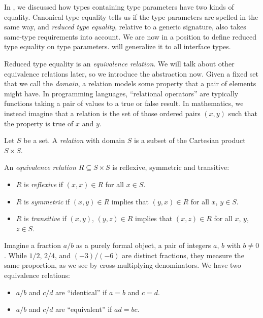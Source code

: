 \documentclass[../generics]{subfiles}
\begin{document}
In , we discussed how types containing type parameters have two kinds of equality. Canonical type equality tells us if the type parameters are spelled in the same way, and \emph{reduced type equality}, relative to a generic signature, also takes same-type requirements into account. We are now in a position to define reduced type equality on type parameters.  will generalize it to all interface types.

Reduced type equality is an \emph{equivalence relation}. We will talk about other equivalence relations later, so we introduce the abstraction now. Given a fixed set that we call the \emph{domain}, a relation models some property that a pair of elements might have. In programming languages, ``relational operators'' are typically functions taking a pair of values to a true or false result. In mathematics, we instead imagine that a relation is the set of those ordered pairs $(x,y)$ such that the property is true of $x$ and $y$.

\begin{definition}\label{def relation}
Let $S$ be a set. A \emph{relation} with domain $S$ is a subset of the Cartesian product $S\times S$.
\end{definition}

\begin{definition}
An \emph{equivalence relation} $R\subseteq S\times S$ is reflexive, symmetric and transitive:
\begin{itemize}
\item $R$ is \emph{reflexive} if $(x,x)\in R$ for all $x\in S$.
\item $R$ is \emph{symmetric} if $(x,y)\in R$ implies that $(y,x)\in R$ for all $x$, $y\in S$.
\item $R$ is \emph{transitive} if $(x,y)$, $(y,z)\in R$ implies that $(x,z)\in R$ for all $x$, $y$, $z\in S$.
\end{itemize}
\end{definition}

Imagine a fraction $a/b$ as a purely formal object, a pair of integers $a$, $b$ with $b \neq 0$. While $1/2$, $2/4$, and $(-3)/(-6)$ are distinct fractions, they measure the same proportion, as we see by cross-multiplying denominators. We have two equivalence relations:
\begin{itemize}
\item $a/b$ and $c/d$ are ``identical'' if $a=b$ and $c=d$.
\item $a/b$ and $c/d$ are ``equivalent'' if $ad=bc$.
\end{itemize}
\end{document}

